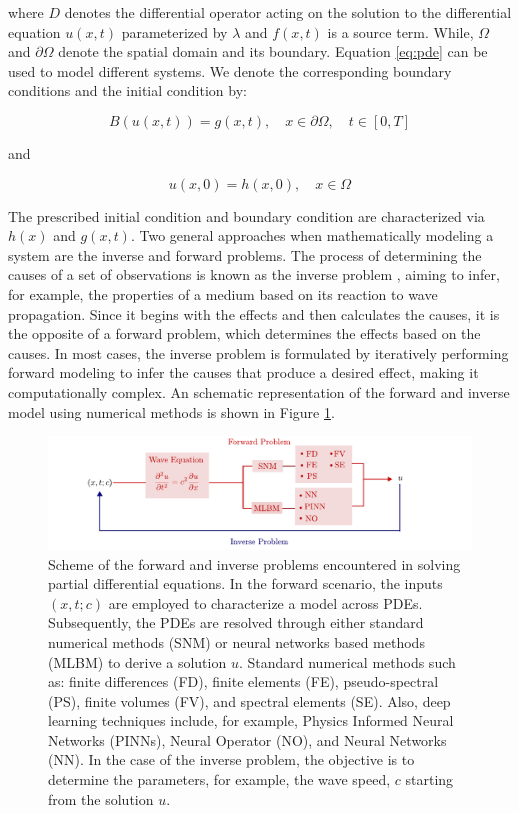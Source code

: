 \documentclass[11pt,twoside]{article}
\begin{document}
where $D$ denotes the differential operator acting on the solution to the differential equation $u(x,t)$ parameterized 
by $\lambda$ and $f(x, t)$ is a source term. While, $\Omega$ and $\partial\Omega$ denote the spatial domain and its boundary. 
Equation \ref{eq:pde} can be used to model different systems. We denote the corresponding boundary conditions and the 
initial condition by:

\begin{equation*}
B (u(x, t)) = g(x, t), \quad x \in \partial \Omega, \quad t \in [0, T] 
\end{equation*}

and

\begin{equation*}
u(x, 0) = h(x, 0), \quad x \in \Omega
\end{equation*}

The prescribed initial condition and boundary condition are characterized via $h(x)$ and $g(x, t)$. Two general approaches 
when mathematically modeling a system are the inverse and forward problems. The process of determining the causes 
of a set of observations is known as the inverse problem \citep{Tarantola}, aiming to infer, for example, the properties of a 
medium based on its reaction to wave propagation. Since it begins with the effects and then calculates the causes, it is the 
opposite of a forward problem, which determines the effects based on the causes. In most cases, the inverse problem is formulated 
by iteratively performing forward modeling to infer the causes that produce a desired effect, making it computationally complex. 
An schematic representation of the forward and inverse model using numerical methods is shown in Figure \ref{fig:forward_inverse}.

\begin{figure}[h]
\includegraphics{figs/forward_inverse_modeling_waves.pdf}
    \caption{Scheme of the forward and inverse problems encountered in solving partial differential equations. In the forward 
    scenario, the inputs $(x,t;c)$ are employed to characterize a model across PDEs. Subsequently, the PDEs are resolved through 
    either standard numerical methods (SNM) or neural networks based methods (MLBM) to derive a solution $u$. Standard numerical 
    methods such as: finite differences (FD), finite elements (FE), pseudo-spectral (PS), finite volumes (FV), and spectral 
    elements (SE). Also, deep learning techniques include, for example, Physics Informed Neural Networks (PINNs), Neural Operator 
    (NO), and Neural Networks (NN). In the case of the inverse problem, the objective is to determine the parameters, for example, 
    the wave speed, $c$ starting from the solution $u$.}
    \label{fig:forward_inverse}
\end{figure}
\end{document}
